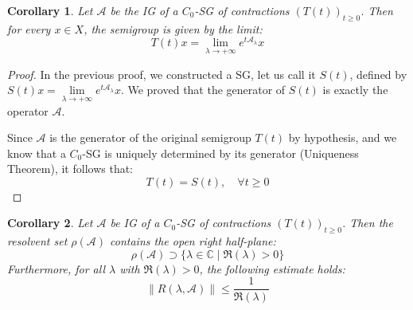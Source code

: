 \documentclass[12pt, oneside]{book}
\newtheorem{coro}{Corollary}[section]
\newcommand{\norm}[1]{\left\lVert#1\right\rVert}
\newcommand{\A}{\mathscr{A}}
\begin{document}
\begin{coro} \label{ya:limit}
Let $\A$ be the IG of a $C_0$-SG of contractions $(T(t))_{t \ge 0}$. Then for every $x \in X$, the semigroup is given by the limit:
$$
T(t)x = \lim_{\lambda \to +\infty} e^{t \A_\lambda} x
$$
\end{coro}

\begin{proof}
In the previous proof, we constructed a SG, let us call it $S(t)$, defined by $S(t)x = \lim\limits_{\lambda \to +\infty} e^{t \A_\lambda}x$. We proved that the generator of $S(t)$ is exactly the operator $\A$.

Since $\A$ is the generator of the original semigroup $T(t)$ by hypothesis, and we know that a $C_0$-SG is uniquely determined by its generator (Uniqueness Theorem), it follows that:
$$
T(t) = S(t), \quad \forall t \ge 0
$$
\end{proof}

\begin{coro}
Let $\A$ be IG of a $C_0$-SG of contractions $(T(t))_{t \ge 0}$. Then the resolvent set $\rho(\A)$ contains the open right half-plane:
$$
\rho(\A) \supset \{ \lambda \in \mathbb{C} \mid \Re(\lambda) > 0 \}
$$
Furthermore, for all $\lambda$ with $\Re(\lambda) > 0$, the following estimate holds:
$$
\norm{R(\lambda, \A)} \le \frac{1}{\Re(\lambda)}
$$
\end{coro}
\end{document}
